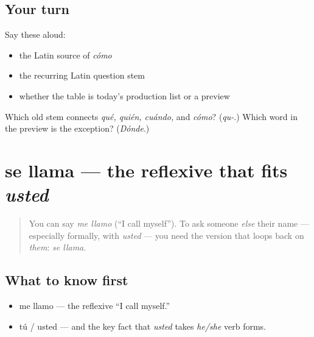 \subsection*{Your turn}
Say these aloud:

\begin{itemize}
\raggedright
  \item the Latin source of \emph{cómo}
  \item the recurring Latin question stem
  \item whether the table is today's production list or a preview
\end{itemize}

\begin{tcolorbox}[breakable,colback=teal!4,colframe=teal!35!black,title={Before you move on}]
Which old stem connects \emph{qué, quién, cuándo,} and \emph{cómo}? (\emph{qu-}.) Which word in the preview is the exception? (\emph{Dónde}.)
\end{tcolorbox}
\section[se llama]{se llama — the reflexive that fits \emph{usted}}

\label{lesson:ES-C03-se-llama}



\begin{quote}
You can say \emph{me llamo} (\textquotedblleft{}I call myself\textquotedblright{}). To ask someone \emph{else} their name — especially formally, with \emph{usted} — you need the version that loops back on \emph{them}: \emph{se llama}.
\end{quote}

\subsection*{What to know first}
\begin{itemize}
\raggedright
  \item me llamo — the reflexive \textquotedblleft{}I call myself.\textquotedblright{}
  \item tú / usted — and the key fact that \emph{usted} takes \emph{he/she} verb forms.
\end{itemize}

